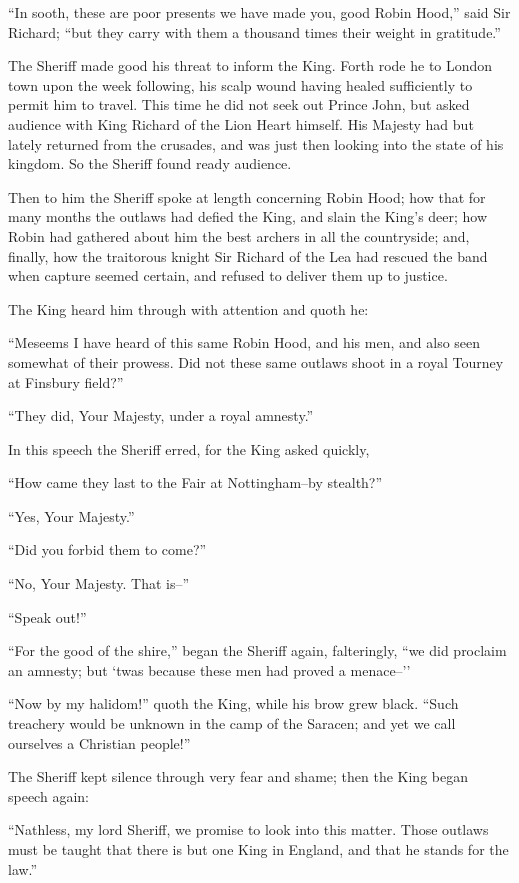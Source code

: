 ``In sooth, these are poor presents we have made you, good Robin Hood,''
said Sir Richard; ``but they carry with them a thousand times their
weight in gratitude.''

The Sheriff made good his threat to inform the King. Forth rode he to
London town upon the week following, his scalp wound having healed
sufficiently to permit him to travel. This time he did not seek out
Prince John, but asked audience with King Richard of the Lion Heart
himself. His Majesty had but lately returned from the crusades, and was
just then looking into the state of his kingdom. So the Sheriff found
ready audience.

Then to him the Sheriff spoke at length concerning Robin Hood; how that
for many months the outlaws had defied the King, and slain the King's
deer; how Robin had gathered about him the best archers in all the
countryside; and, finally, how the traitorous knight Sir Richard of the
Lea had rescued the band when capture seemed certain, and refused to
deliver them up to justice.

The King heard him through with attention and quoth he:

``Meseems I have heard of this same Robin Hood, and his men, and also
seen somewhat of their prowess. Did not these same outlaws shoot in a
royal Tourney at Finsbury field?''

``They did, Your Majesty, under a royal amnesty.''

In this speech the Sheriff erred, for the King asked quickly,

``How came they last to the Fair at Nottingham--by stealth?''

``Yes, Your Majesty.''

``Did you forbid them to come?''

``No, Your Majesty. That is--''

``Speak out!''

``For the good of the shire,'' began the Sheriff again, falteringly,
``we did proclaim an amnesty; but `twas because these men had proved a
menace--''

``Now by my halidom!'' quoth the King, while his brow grew black. ``Such
treachery would be unknown in the camp of the Saracen; and yet we call
ourselves a Christian people!''

The Sheriff kept silence through very fear and shame; then the King
began speech again:

``Nathless, my lord Sheriff, we promise to look into this matter. Those
outlaws must be taught that there is but one King in England, and that
he stands for the law.''

